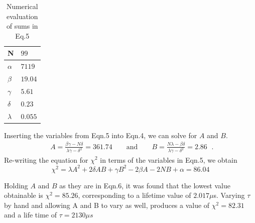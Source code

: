 \documentclass[12pt]{article}
\begin{document}
\begin{table}[htbp]\centering
\begin{tabular}{ |p{0.5cm}|p{3cm}|}
 \hline
  N & \qquad $99$\\
 \hline
$\alpha$ & \qquad $7119$\\
\hline
 $\beta$ & \qquad $19.04$ \\
 \hline
 $\gamma$ & \qquad $5.61$ \\
 \hline
 $\delta$ & \qquad $0.23$ \\
 \hline
 $\lambda$ & \qquad $0.055$ \\
 \hline
\end{tabular}
\def\sym#1{\ifmmode^{#1}\else\(^{#1}\)\fi}
\caption{Numerical evaluation of sums in Eq.5}
\end{table}
\noindent
Inserting the variables from Eqn.5 into Eqn.4, we can solve for $A$ and $B$.
\begin{equation}
\begin{split}
A = \frac{\beta\gamma - N\delta}{\lambda\gamma - \delta^2} = 361.74 \qquad\text{and}\qquad B = \frac{N\lambda - \beta\delta}{\lambda\gamma - \delta^2} = 2.86
\end{split}\:.
\end{equation}
Re-writing the equation for $\chi^2$ in terms of the variables in Eqn.5, we obtain
\begin{equation}
\chi^2 = \lambda A^2 + 2\delta AB + \gamma B^2 - 2\beta A - 2NB + \alpha = 86.04
\end{equation}

Holding $A$ and $B$ as they are in Eqn.6, it was found that the lowest value obtainable is $\chi^2 = 85.26$, corresponding to a lifetime value of $2.017\mu$s. Varying $\tau$ by hand and allowing A and B to vary as well, produces a value of $\chi^2 = 82.31$ and a life time of $\tau = 2130\mu s$\\
\end{document}
